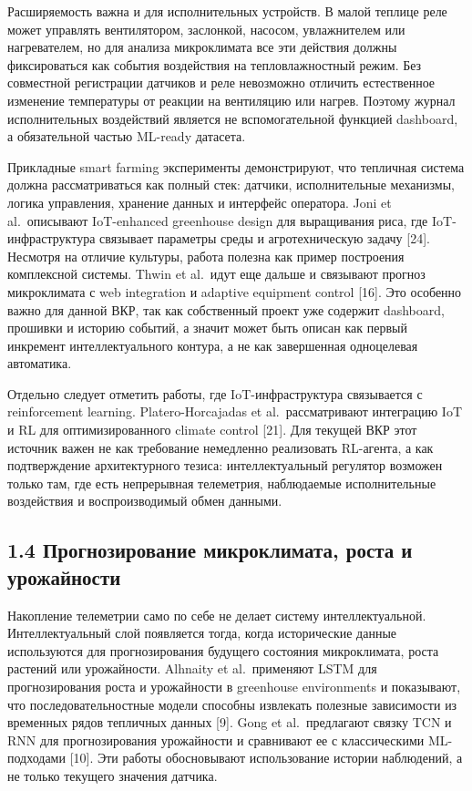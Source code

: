 \documentclass[a4paper,14pt]{extarticle}
\begin{document}
Расширяемость важна и для исполнительных устройств. В малой теплице реле
может управлять вентилятором, заслонкой, насосом, увлажнителем или
нагревателем, но для анализа микроклимата все эти действия должны
фиксироваться как события воздействия на тепловлажностный режим. Без
совместной регистрации датчиков и реле невозможно отличить естественное
изменение температуры от реакции на вентиляцию или нагрев. Поэтому
журнал исполнительных воздействий является не вспомогательной функцией
dashboard, а обязательной частью ML-ready датасета.

Прикладные smart farming эксперименты демонстрируют, что тепличная
система должна рассматриваться как полный стек: датчики, исполнительные
механизмы, логика управления, хранение данных и интерфейс оператора.
Joni et al.~описывают IoT-enhanced greenhouse design для выращивания
риса, где IoT-инфраструктура связывает параметры среды и агротехническую
задачу {[}24{]}. Несмотря на отличие культуры, работа полезна как пример
построения комплексной системы. Thwin et al.~идут еще дальше и связывают
прогноз микроклимата с web integration и adaptive equipment control
{[}16{]}. Это особенно важно для данной ВКР, так как собственный проект
уже содержит dashboard, прошивки и историю событий, а значит может быть
описан как первый инкремент интеллектуального контура, а не как
завершенная одноцелевая автоматика.

Отдельно следует отметить работы, где IoT-инфраструктура связывается с
reinforcement learning. Platero-Horcajadas et al.~рассматривают
интеграцию IoT и RL для оптимизированного climate control {[}21{]}. Для
текущей ВКР этот источник важен не как требование немедленно реализовать
RL-агента, а как подтверждение архитектурного тезиса: интеллектуальный
регулятор возможен только там, где есть непрерывная телеметрия,
наблюдаемые исполнительные воздействия и воспроизводимый обмен данными.

\subsection{1.4 Прогнозирование микроклимата, роста и
урожайности}\label{ux43fux440ux43eux433ux43dux43eux437ux438ux440ux43eux432ux430ux43dux438ux435-ux43cux438ux43aux440ux43eux43aux43bux438ux43cux430ux442ux430-ux440ux43eux441ux442ux430-ux438-ux443ux440ux43eux436ux430ux439ux43dux43eux441ux442ux438}

Накопление телеметрии само по себе не делает систему интеллектуальной.
Интеллектуальный слой появляется тогда, когда исторические данные
используются для прогнозирования будущего состояния микроклимата, роста
растений или урожайности. Alhnaity et al.~применяют LSTM для
прогнозирования роста и урожайности в greenhouse environments и
показывают, что последовательностные модели способны извлекать полезные
зависимости из временных рядов тепличных данных {[}9{]}. Gong et
al.~предлагают связку TCN и RNN для прогнозирования урожайности и
сравнивают ее с классическими ML-подходами {[}10{]}. Эти работы
обосновывают использование истории наблюдений, а не только текущего
значения датчика.
\end{document}
